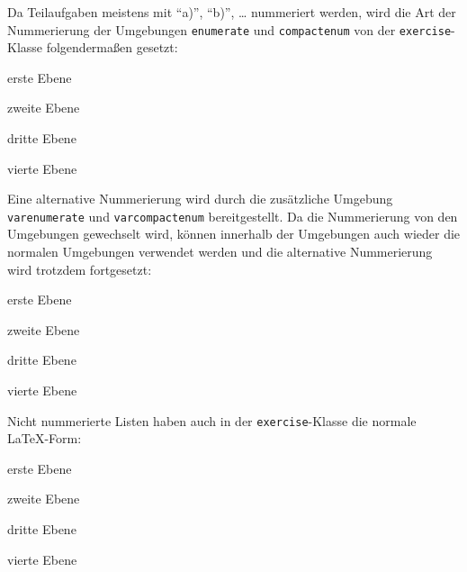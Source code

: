 \documentclass{exercise}
\begin{document}
    Da Teilaufgaben meistens mit \enquote{a)}, \enquote{b)}, \ldots{} nummeriert werden, wird die Art der Nummerierung der Umgebungen \lstinline{enumerate} und \lstinline{compactenum} von der \texttt{exercise}-Klasse folgendermaßen gesetzt:
    \begin{compactenum}
      \item erste Ebene
        \begin{compactenum}
          \item zweite Ebene
            \begin{compactenum}
              \item dritte Ebene
                \begin{compactenum}
                  \item vierte Ebene
                \end{compactenum}
            \end{compactenum}
        \end{compactenum}
    \end{compactenum}
    
    Eine alternative Nummerierung wird durch die zusätzliche Umgebung \lstinline{varenumerate} und \lstinline{varcompactenum} bereitgestellt. Da die Nummerierung von den Umgebungen gewechselt wird, können innerhalb der Umgebungen auch wieder die normalen Umgebungen verwendet werden und die alternative Nummerierung wird trotzdem fortgesetzt:
    \begin{varcompactenum}
      \item erste Ebene
        \begin{compactenum}
          \item zweite Ebene
            \begin{compactenum}
              \item dritte Ebene
                \begin{compactenum}
                  \item vierte Ebene
                \end{compactenum}
            \end{compactenum}
        \end{compactenum}
    \end{varcompactenum}
    
    Nicht nummerierte Listen haben auch in der \texttt{exercise}-Klasse die normale \LaTeX{}-Form:
    \begin{compactitem}
      \item erste Ebene
        \begin{compactitem}
          \item zweite Ebene
            \begin{compactitem}
              \item dritte Ebene
                \begin{compactitem}
                  \item vierte Ebene
                \end{compactitem}
            \end{compactitem}
        \end{compactitem}
    \end{compactitem}
    
\end{document}
